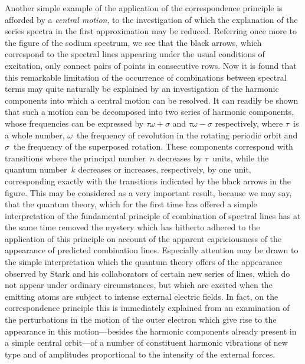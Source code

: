 Another simple example of the application of the correspondence
principle is afforded by a \emph{central motion}, to the investigation of
which the explanation of the series spectra in the first approximation
may be reduced. Referring once more to the figure of the
sodium spectrum, we see that the black arrows, which correspond
to the spectral lines appearing under the usual conditions of
excitation, only connect pairs of points in consecutive rows. Now
it is found that this remarkable limitation of the occurrence of
combinations between spectral terms may quite naturally be
explained by an investigation of the harmonic components into
which a central motion can be resolved. It can readily be shown
that such a motion can be decomposed into two series of harmonic
components, whose frequencies can be expressed by $\tau\omega + \sigma$ and
$\tau\omega - \sigma$ respectively, where $\tau$~is a whole number, $\omega$~the frequency of
revolution in the rotating periodic orbit and $\sigma$~the frequency of the
superposed rotation. These components correspond with transitions
where the principal number~$n$ decreases by $\tau$~units, while the
quantum number~$k$ decreases or increases, respectively, by one
unit, corresponding exactly with the transitions indicated by the
black arrows in the figure. This may be considered as a very
important result, because we may say, that the quantum theory,
which for the first time has offered a simple interpretation of the
fundamental principle of combination of spectral lines has at the
same time removed the mystery which has hitherto adhered
to the application of this principle on account of the apparent
capriciousness of the appearance of predicted combination lines.
Especially attention may be drawn to the simple interpretation
which the quantum theory offers of the appearance observed by
Stark and his collaborators of certain new series of lines, which do
not appear under ordinary circumstances, but which are excited
when the emitting atoms are subject to intense external electric
fields. In fact, on the correspondence principle this is immediately
explained from an examination of the perturbations in the motion
of the outer electron which give rise to the appearance in this
motion---besides the harmonic components already present in a
simple central orbit---of a number of constituent harmonic vibrations
of new type and of amplitudes proportional to the intensity
of the external forces.

